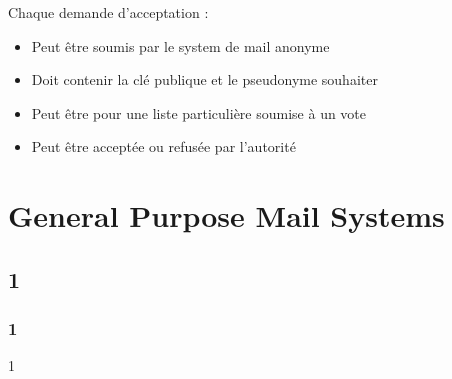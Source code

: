 \documentclass{beamer}
\begin{document}
\begin{frame}
Chaque demande d'acceptation :
\begin{itemize}
[triangle]
\item Peut être soumis par le system de mail anonyme
\item Doit contenir la clé publique et le pseudonyme souhaiter
\item Peut être pour une liste particulière soumise à un vote
\item Peut être acceptée ou refusée par l’autorité
\end{itemize}
\end{frame}


\section{General Purpose Mail Systems}
\subsection{1}
\begin{frame}
\frametitle{1}
1
\end{frame}
\end{document}
